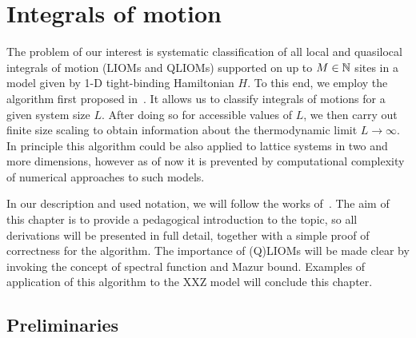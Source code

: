 \chapter{Integrals of motion}
\thispagestyle{chapterBeginStyle}

The problem of our interest is systematic classification of all local and quasilocal integrals of
motion (LIOMs and QLIOMs) supported on up to \( M \in \mathbb{N} \) sites in a model given by 1-D tight-binding Hamiltonian \(H\). 
To this end, we employ the algorithm first proposed in~\textcite{Mierzejewski2015a}. It allows us to classify integrals
of motions for a given system size \(L\). After doing so for accessible values of \(L\), we then carry out finite size scaling
to obtain information about the thermodynamic limit \(L \to \infty \). In principle this algorithm could
be also applied to lattice systems in two and more dimensions, however as of now it is prevented by computational
complexity of numerical approaches to such models.

In our description and used notation, we will follow
the works of~\textcite{Mierzejewski2015a,Mierzejewski2015Approx,Mierzejewski2018}.
The aim of this chapter is to provide a pedagogical introduction to the topic,
so all derivations will be presented in full detail, together with a simple proof of correctness for the algorithm.
The importance of (Q)LIOMs will be made clear by invoking the concept of spectral function and Mazur bound.
Examples of application of this algorithm to the XXZ model will conclude this chapter.
\section{Preliminaries\label{sec:prelim}}
